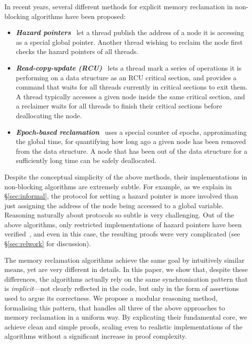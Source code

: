 In recent years, several different methods for explicit memory reclamation in
non-blocking algorithms have been proposed:
\begin{itemize}
\vspace{-2pt}
\item {\bf\em Hazard pointers}~\cite{hazard} let a thread publish the address of
  a node it is accessing as a special global pointer. Another thread wishing to
  reclaim the node first checks the hazard pointers of all threads.
\item {\bf\em Read-copy-update (RCU)}~\cite{rcu-thesis} lets a thread mark a
  series of operations it is performing on a data structure as an RCU critical
  section, and provides a command that waits for all threads currently in 
  critical sections to exit them. A thread typically accesses a given node
  inside the same critical section, and a reclaimer waits for all threads to
  finish their critical sections before deallocating the node.
\item {\bf\em Epoch-based reclamation}~\cite{fraser-thesis} uses a special
  counter of epochs, approximating the global time, for quantifying how long ago
  a given node has been removed from the data structure. A node that has been
  out of the data structure for a sufficiently long time can be
  safely deallocated.
\end{itemize}
\vspace{-2pt}

Despite the conceptual simplicity of the above methods, their implementations in
non-blocking algorithms are extremely subtle. For example, as we explain in
\S\ref{sec:informal}, the protocol for setting a hazard pointer is more involved
than just assigning the address of the node being accessed to a global variable.
Reasoning naturally about protocols so subtle is very challenging. Out of the
above algorithms, only restricted implementations of hazard pointers have been
verified~\cite{parkinson-hazard,hazard-feng,turkish,kiv}, and even in this case,
the resulting proofs were very complicated (see \S\ref{sec:relwork}
for discussion).

The memory reclamation algorithms achieve the same goal by intuitively
similar means, yet are very different in details. In this paper, we show that,
despite these differences, the algorithms actually rely on the same
synchronisation pattern that is {\em implicit}---not clearly reflected in the
code, but only in the form of assertions used to argue its correctness. We
propose a modular reasoning method, formalising this pattern, that handles all
three of the above approaches to memory reclamation in a uniform way. By
explicating their fundamental core, we achieve %
clean and
simple proofs, scaling even to realistic implementations of the algorithms
without a significant increase in proof complexity.

